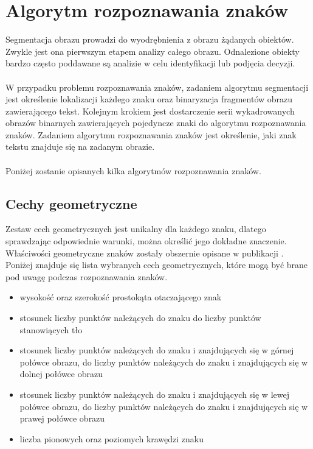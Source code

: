 \section{Algorytm rozpoznawania znaków}\label{sec:ocr}
Segmentacja obrazu prowadzi do wyodrębnienia z obrazu żądanych obiektów. Zwykle jest ona pierwszym etapem analizy całego obrazu. Odnalezione obiekty bardzo często poddawane są analizie w celu identyfikacji lub podjęcia decyzji.
\paragraph{}
W przypadku problemu rozpoznawania znaków, zadaniem algorytmu segmentacji jest określenie lokalizacji każdego znaku oraz binaryzacja fragmentów obrazu zawierającego tekst. Kolejnym krokiem jest dostarczenie serii wykadrowanych obrazów binarnych zawierających pojedyncze znaki do algorytmu rozpoznawania znaków. Zadaniem algorytmu rozpoznawania znaków jest określenie, jaki znak tekstu znajduje się na zadanym obrazie.
\paragraph{}
Poniżej zostanie opisanych kilka algorytmów rozpoznawania znaków.
\subsection{Cechy geometryczne}
Zestaw cech geometrycznych jest unikalny dla każdego znaku, dlatego sprawdzając odpowiednie warunki, można określić jego dokładne znaczenie. Właściwości geometryczne znaków zostały obszernie opisane w publikacji \cite{frey91}. Poniżej znajduje się lista wybranych cech geometrycznych, które mogą być brane pod uwagę podczas rozpoznawania znaków.
\begin{itemize}
  \item wysokość oraz szerokość prostokąta otaczającego znak
  \item stosunek liczby punktów należących do znaku do liczby punktów stanowiących tło
  \item stosunek liczby punktów należących do znaku i znajdujących się w górnej połówce obrazu, do liczby punktów należących do znaku i znajdujących się w dolnej połówce obrazu
    \item stosunek liczby punktów należących do znaku i znajdujących się w lewej połówce  obrazu, do liczby punktów należących do znaku i znajdujących się w prawej połówce obrazu
    \item liczba pionowych oraz poziomych krawędzi znaku
\end{itemize}
